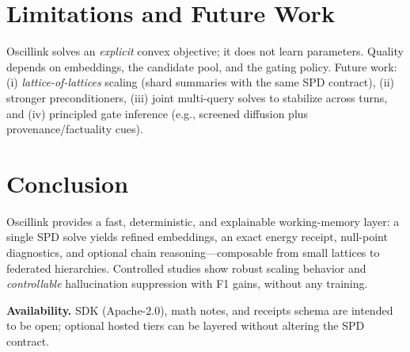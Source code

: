 \documentclass[11pt]{article}
\begin{document}
\vspace{-0.5em}
\section{Limitations and Future Work}
Oscillink solves an \emph{explicit} convex objective; it does not learn parameters. Quality depends on embeddings, the candidate pool, and the gating policy. Future work: (i) \emph{lattice-of-lattices} scaling (shard summaries with the same SPD contract), (ii) stronger preconditioners, (iii) joint multi-query solves to stabilize across turns, and (iv) principled gate inference (e.g., screened diffusion plus provenance/factuality cues).

\vspace{-0.5em}
\section{Conclusion}
Oscillink provides a fast, deterministic, and explainable working-memory layer: a single SPD solve yields refined embeddings, an exact energy receipt, null-point diagnostics, and optional chain reasoning—composable from small lattices to federated hierarchies. Controlled studies show robust scaling behavior and \emph{controllable} hallucination suppression with F1 gains, without any training.

\vspace{0.25em}
\noindent\textbf{Availability.} SDK (Apache-2.0), math notes, and receipts schema are intended to be open; optional hosted tiers can be layered without altering the SPD contract.
\end{document}

